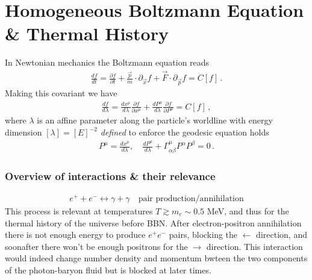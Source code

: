 \section{Homogeneous Boltzmann Equation \& Thermal History}


In Newtonian mechanics the Boltzmann equation reads
\begin{align}\label{eq:newtonian_boltzmann_eq}
\frac{df}{dt}=\frac{\partial f}{\partial t} + \frac{\vec{p}}{m} \cdot \partial_{\vec{x}} f + \vec{F} \cdot \partial_{\vec{p}} f = C[f]\,.
\end{align}
Making this covariant we have
\begin{align}\label{eq:covariant_boltzmann_eq}
    \frac{df}{d\lambda} = \frac{dx^\mu}{d\lambda} \frac{\partial f}{\partial x^\mu} + \frac{dP^\mu}{d\lambda} \frac{\partial f}{\partial P^\mu} = C[f]\,,
\end{align}
where $\lambda$ is an affine parameter along the particle's worldline with energy dimension $[\lambda]=[E]^{-2}$ \emph{defined} to enforce the geodesic equation holds
\begin{align}
    P^\mu=\frac{dx^\mu}{d\lambda},\quad \frac{dP^\mu}{d\lambda} + \Gamma^\mu_{\alpha\beta} P^\alpha P^\beta =0\,.
\end{align}








\subsubsection{Overview of interactions \& their relevance}


\begin{align}
    e^++e^- \leftrightarrow \gamma + \gamma \quad \text{pair production/annihilation}
\end{align}
This process is relevant at temperatures $T \gtrsim m_e \sim 0.5$ MeV, and thus for the thermal history of the universe before BBN.
After electron-positron annihilation there is not enough energy to produce $e^+e^-$ pairs, blocking the $\leftarrow$ direction, and soonafter there won't be enough positrons for the $\rightarrow$ direction.
This interaction would indeed change number density and momentum bwteen the two components of the photon-baryon fluid but is blocked at later times.

